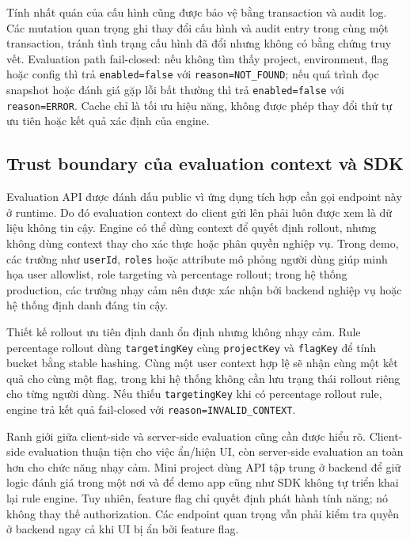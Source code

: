 Tính nhất quán của cấu hình cũng được bảo vệ bằng transaction và audit log. Các mutation quan trọng ghi thay đổi cấu hình và audit entry trong cùng một transaction, tránh tình trạng cấu hình đã đổi nhưng không có bằng chứng truy vết. Evaluation path fail-closed: nếu không tìm thấy project, environment, flag hoặc config thì trả \texttt{enabled=false} với \texttt{reason=NOT\_FOUND}; nếu quá trình đọc snapshot hoặc đánh giá gặp lỗi bất thường thì trả \texttt{enabled=false} với \texttt{reason=ERROR}. Cache chỉ là tối ưu hiệu năng, không được phép thay đổi thứ tự ưu tiên hoặc kết quả xác định của engine.

\subsection{Trust boundary của evaluation context và SDK}

Evaluation API được đánh dấu public vì ứng dụng tích hợp cần gọi endpoint này ở runtime. Do đó evaluation context do client gửi lên phải luôn được xem là dữ liệu không tin cậy. Engine có thể dùng context để quyết định rollout, nhưng không dùng context thay cho xác thực hoặc phân quyền nghiệp vụ. Trong demo, các trường như \texttt{userId}, \texttt{roles} hoặc attribute mô phỏng người dùng giúp minh họa user allowlist, role targeting và percentage rollout; trong hệ thống production, các trường nhạy cảm nên được xác nhận bởi backend nghiệp vụ hoặc hệ thống định danh đáng tin cậy.

Thiết kế rollout ưu tiên định danh ổn định nhưng không nhạy cảm. Rule percentage rollout dùng \texttt{targetingKey} cùng \texttt{projectKey} và \texttt{flagKey} để tính bucket bằng stable hashing. Cùng một user context hợp lệ sẽ nhận cùng một kết quả cho cùng một flag, trong khi hệ thống không cần lưu trạng thái rollout riêng cho từng người dùng. Nếu thiếu \texttt{targetingKey} khi có percentage rollout rule, engine trả kết quả fail-closed với \texttt{reason=INVALID\_CONTEXT}.

Ranh giới giữa client-side và server-side evaluation cũng cần được hiểu rõ. Client-side evaluation thuận tiện cho việc ẩn/hiện UI, còn server-side evaluation an toàn hơn cho chức năng nhạy cảm. Mini project dùng API tập trung ở backend để giữ logic đánh giá trong một nơi và để demo app cũng như SDK không tự triển khai lại rule engine. Tuy nhiên, feature flag chỉ quyết định phát hành tính năng; nó không thay thế authorization. Các endpoint quan trọng vẫn phải kiểm tra quyền ở backend ngay cả khi UI bị ẩn bởi feature flag.

